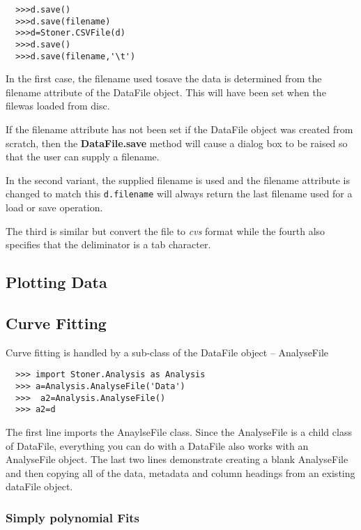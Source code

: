 \documentclass[a4paper,11pt]{scrartcl}
\begin{document}
\begin{verbatim}
  >>>d.save()
  >>>d.save(filename)
  >>>d=Stoner.CSVFile(d)
  >>>d.save()
  >>>d.save(filename,'\t')
\end{verbatim}

In the first case, the filename used tosave the data is determined from the
filename attribute of the DataFile object. This will have been set when the
filewas loaded from disc.

If the filename attribute has not been set \eg if the DataFile object was
created from scratch, then the \textbf{DataFile.save} method will cause a dialog
box to be raised so that the user can supply a filename.

In the second variant, the supplied filename is used and the filename attribute
is changed to match this \ie \verb#d.filename# will always return the last
filename used for a load or save operation.

The third is similar but convert the file to \textit{cvs} format while the fourth also specifies that the deliminator is a tab character.

\subsection{Plotting Data}

\subsection{Curve Fitting}

Curve fitting is handled by a sub-class of the DataFile object -- AnalyseFile

\begin{verbatim}
  >>> import Stoner.Analysis as Analysis
  >>> a=Analysis.AnalyseFile('Data')
  >>>  a2=Analysis.AnalyseFile()
  >>> a2=d
\end{verbatim}

The first line imports the AnaylseFile class. Since the AnalyseFile is a child
class of DataFile, everything you can do with a DataFile also works with an
AnalyseFile object. The last two lines demonstrate creating a blank AnalyseFile
and then copying all of the data, metadata and column headings from an existing
dataFile object.

\subsubsection{Simply polynomial Fits}
\end{document}
